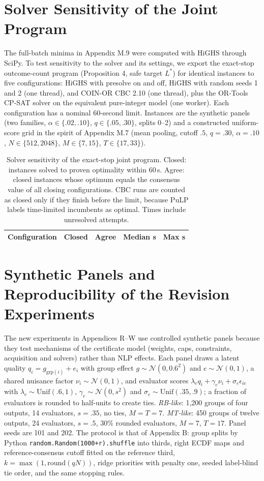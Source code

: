 \documentclass[11pt]{article}
\begin{document}
\section{Solver Sensitivity of the Joint Program}
\label{app:solvers}
The full-batch minima in Appendix M.9 were computed with HiGHS through SciPy. To test sensitivity to the solver and its settings, we export the exact-stop outcome-count program (Proposition 4, safe target $L^*$) for identical instances to five configurations: HiGHS with presolve on and off, HiGHS with random seeds 1 and 2 (one thread), and COIN-OR CBC 2.10 (one thread), plus the OR-Tools CP-SAT solver on the equivalent pure-integer model (one worker). Each configuration has a nominal 60-second limit. Instances are the synthetic panels (two families, $\alpha\in\{.02,.10\}$, $q\in\{.05,.30\}$, splits 0--2) and a constructed uniform-score grid in the spirit of Appendix M.7 (mean pooling, cutoff $.5$, $q=.30$, $\alpha=.10$, $N\in\{512,2048\}$, $M\in\{7,15\}$, $T\in\{17,33\}$). %

\begin{table}[t]
\centering\small
\setlength{\tabcolsep}{3pt}
\begin{tabular}{@{}lrrrr@{}}
\toprule
Configuration & Closed & Agree & Median s & Max s\\
\midrule
\bottomrule
\end{tabular}
\caption{Solver sensitivity of the exact-stop joint program. Closed: instances solved to proven optimality within 60\,s. Agree: closed instances whose optimum equals the consensus value of all closing configurations. CBC runs are counted as closed only if they finish before the limit, because PuLP labels time-limited incumbents as optimal. Times include unresolved attempts.}
\label{tab:solvers}
\end{table}

\section{Synthetic Panels and Reproducibility of the Revision Experiments}
\label{app:synthetic}
The new experiments in Appendices R--W use controlled synthetic panels because they test mechanisms of the certificate model (weights, caps, constraints, acquisition and solvers) rather than NLP effects. Each panel draws a latent quality $q_i=g_{\mathrm{grp}(i)}+e_i$ with group effect $g\sim\mathcal N(0,0.6^2)$ and $e\sim\mathcal N(0,1)$, a shared nuisance factor $\nu_i\sim\mathcal N(0,1)$, and evaluator scores $\lambda_eq_i+\gamma_e\nu_i+\sigma_e\epsilon_{ie}$ with $\lambda_e\sim\mathrm{Unif}(.6,1)$, $\gamma_e\sim\mathcal N(0,s^2)$ and $\sigma_e\sim\mathrm{Unif}(.35,.9)$; a fraction of evaluators is rounded to half-units to create ties. \emph{RB-like}: 1,200 groups of four outputs, 14 evaluators, $s=.35$, no ties, $M=T=7$. \emph{MT-like}: 450 groups of twelve outputs, 24 evaluators, $s=.5$, 30\% rounded evaluators, $M=7$, $T=17$. Panel seeds are 101 and 202. The protocol is that of Appendix B: group splits by Python \texttt{random.Random(1000+r).shuffle} into thirds, right ECDF maps and reference-consensus cutoff fitted on the reference third, $k=\max(1,\mathrm{round}(qN))$, ridge priorities with penalty one, seeded label-blind tie order, and the same stopping rules.
\end{document}
